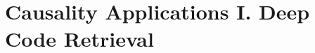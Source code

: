\documentclass[cpp,11pt]{wmthesis}
\begin{document}
\makeThesisProlog












\part{Causality Applications I. \hfill \break Deep Code Retrieval}





%

\end{document}
